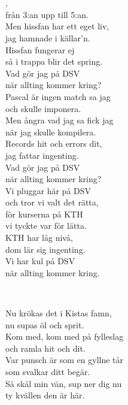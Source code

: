 \\

\newpage 


 \\       

,\\ 
från 3:an upp till 5:an.\\ 
Men hissfan har ett eget liv,\\ 
jag hamnade i källar'n.\\ 
Hissfan fungerar ej\\ 
så i trappa blir det spring.\\ 
Vad gör jag på DSV\\ 
när allting kommer kring?\\ 
Pascal är ingen match sa jag\\ 
och skulle imponera.\\ 
Men ångra vad jag sa fick jag\\ 
när jag skulle kompilera.\\ 
Records hit och errors dit,\\ 
jag fattar ingenting.\\ 
Vad gör jag på DSV\\ 
när allting kommer kring?\\ 
Vi pluggar här på DSV\\ 
och tror vi valt det rätta,\\ 
för kurserna på KTH\\ 
vi tyckte var för lätta.\\ 
KTH har låg nivå,\\ 
dom lär sig ingenting.\\ 
Vi har kul på DSV\\ 
när allting kommer kring.


\newpage 


 \\       
\author{Text: förmodligen Rasmus Larsson}

\songtext{} 
Nu krökas det i Kistas famn,\\
nu supas öl och sprit.\\
Kom med, kom med på fylleslag\\
och ramla hit och dit.\\
Var punsch är som en gyllne tår\\
som svalkar ditt begär.\\
Så skål min vän, sup ner dig nu\\
ty kvällen den är här.

